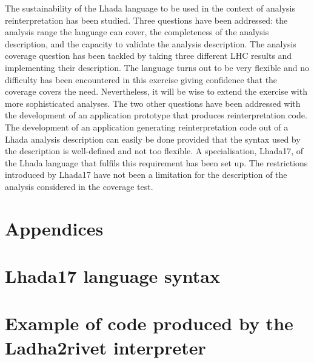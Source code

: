 \documentclass[11pt]{cernrep}
\begin{document}
The sustainability of the {\sc Lhada} language to be used in the context of analysis reinterpretation has been studied. Three questions have been addressed: the analysis range the language can cover, the completeness of the analysis description, and the capacity to validate the analysis description. The analysis coverage question has been tackled by taking three different LHC results and implementing their description. The language turns out to be very flexible and no difficulty has been encountered in this exercise giving confidence that the coverage covers the need. Nevertheless, it will be wise to extend the exercise with more sophisticated analyses. The two other questions have been addressed with the development of an application prototype that produces reinterpretation code.  The development of an application generating reinterpretation code out of a {\sc Lhada} analysis description can easily be done provided that the syntax used by the description is well-defined and not too flexible. A specialisation, {\sc Lhada17}, of the {\sc Lhada} language that fulfils this requirement has been set up. The restrictions introduced by {\sc Lhada17} have not been a limitation for the description of the analysis considered in the coverage test. 

\section*{Appendices}

\appendix

\section{{\sc Lhada17} language syntax}\label{app:ebnf}


\section{Example of code produced by the {\sc Ladha2rivet} interpreter}\label{app:code}



\end{document}
